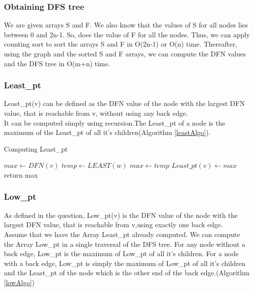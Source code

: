 \documentclass{article}
\begin{document}
\subsubsection{Obtaining DFS tree}
We are given arrays S and F. We also know that the values of S for all nodes lies between 0 and 2n-1. So, does the value of F for all the nodes. Thus, we can apply counting sort to sort the arrays S and F in O(2n-1) or O(n) time. Thereafter, using the graph and the sorted S and F arrays, we can compute the DFN values and the DFS tree in O(m+n) time.	

\subsubsection{Least\_pt}
\label{least}
Least\_pt(v) can be defined as the DFN value of the node with the largest DFN value, that is reachable from v, without using any back edge.\\
It can be computed simply using recursion.The Least\_pt of a node is the maximum of the Least\_pt of all it's children(Algorithm \ref{leastAlgo}).

\begin{algorithm}
\caption{Computing Least\_pt}
\label{leastAlgo}
\begin{algorithmic}[1]
\State $max \gets DFN(v) $
  
\State $temp \gets LEAST(w)$
\State $max \gets temp $
\EndIf
\EndFor
\State $Least\_pt(v) \gets max$
\State return max
\EndProcedure
\end{algorithmic}
\end{algorithm}

\subsubsection{Low\_pt}
\label{low}
As defined in the question, Low\_pt(v) is the DFN value of the node with the largest DFN value, that is reachable from v,using exactly one back edge.\\
Assume that we have the Array Least\_pt already computed. We can compute the Array Low\_pt in a single traversal of the DFS tree. For any node without a back edge, Low\_pt is the maximum of Low\_pt  of all it's children. For a node with a back edge, Low\_pt is simply the maximum of Low\_pt of all it's children and the Least\_pt of the node which is the other end of the back edge.(Algorithm \ref{lowAlgo})
\end{document}

